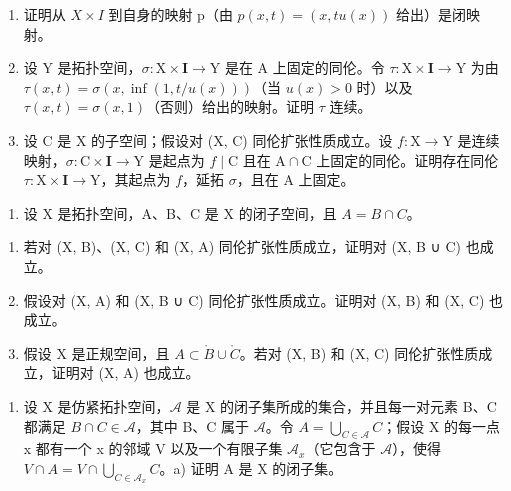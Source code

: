 \begin{enumerate}
\def\labelenumi{\alph{enumi})}
\item
  证明从 \(X \times I\) 到自身的映射 p（由 \(p(x,t) = (x,tu(x))\) 给出）是闭映射。
\item
  设 Y 是拓扑空间，\(\sigma\colon\mathrm{X}\times\mathbf{I}\to\mathrm{Y}\) 是在 A 上固定的同伦。令 \(\tau\colon\mathrm{X}\times\mathbf{I}\to\mathrm{Y}\) 为由 \(\tau(x,t)=\sigma(x,\inf(1,t/u(x)))\)（当 \(u(x)>0\) 时）以及 \(\tau(x,t)=\sigma(x,1)\)（否则）给出的映射。证明 \(\tau\) 连续。
\item
  设 C 是 X 的子空间；假设对 (X, C) 同伦扩张性质成立。设 \(f \colon \mathrm{X} \to \mathrm{Y}\) 是连续映射，\(\sigma \colon \mathrm{C} \times \mathbf{I} \to \mathrm{Y}\) 是起点为 \(f \mid \mathrm{C}\) 且在 \(\mathrm{A} \cap \mathrm{C}\) 上固定的同伦。证明存在同伦 \(\tau \colon \mathrm{X} \times \mathbf{I} \to \mathrm{Y}\)，其起点为 \(f\)，延拓 \(\sigma\)，且在 \(\mathrm{A}\) 上固定。
\end{enumerate}

\begin{enumerate}
\def\labelenumi{\arabic{enumi})}
\setcounter{enumi}{19}
\tightlist
\item
  设 X 是拓扑空间，A、B、C 是 X 的闭子空间，且 \(A = B \cap C\)。
\end{enumerate}

\begin{enumerate}
\def\labelenumi{\alph{enumi})}
\item
  若对 (X, B)、(X, C) 和 (X, A) 同伦扩张性质成立，证明对 (X, B ∪ C) 也成立。
\item
  假设对 (X, A) 和 (X, B ∪ C) 同伦扩张性质成立。证明对 (X, B) 和 (X, C) 也成立。
\item
  假设 X 是正规空间，且 \(A \subset \mathring{B} \cup \mathring{C}\)。若对 (X, B) 和 (X, C) 同伦扩张性质成立，证明对 (X, A) 也成立。
\end{enumerate}

\begin{enumerate}
\def\labelenumi{\arabic{enumi})}
\setcounter{enumi}{20}
\tightlist
\item
  设 X 是仿紧拓扑空间，\(\mathcal{A}\) 是 X 的闭子集所成的集合，并且每一对元素 B、C 都满足 \(B \cap C \in \mathcal{A}\)，其中 B、C 属于 \(\mathcal{A}\)。令 \(A = \bigcup_{C \in \mathcal{A}} C\)；假设 X 的每一点 x 都有一个 x 的邻域 V 以及一个有限子集 \(\mathcal{A}_x\)（它包含于 \(\mathcal{A}\)），使得 \(V \cap A = V \cap \bigcup_{C \in \mathcal{A}_x} C\)。a) 证明 A 是 X 的闭子集。
\end{enumerate}

